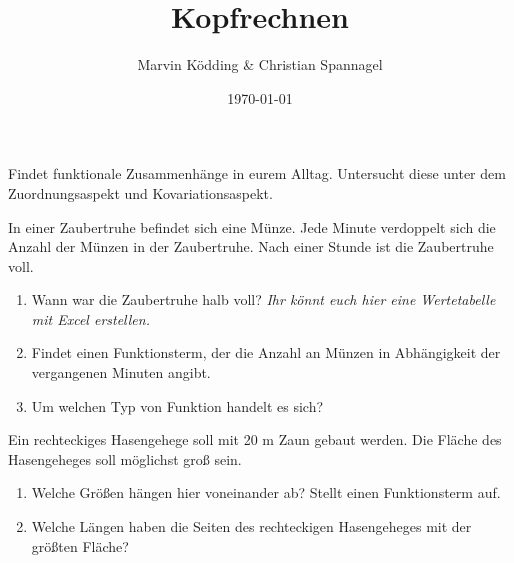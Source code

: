 \documentclass{cssheet}
\title{Kopfrechnen}
\author{Marvin Ködding \& Christian Spannagel}
\date{\today}
\begin{document}
\printtitle

\begin{aufgabe}
	Findet funktionale Zusammenhänge in eurem Alltag. Untersucht diese unter dem Zuordnungsaspekt und Kovariationsaspekt.
\end{aufgabe}

\begin{aufgabe}[Zaubertruhe]
	In einer Zaubertruhe befindet sich eine Münze. Jede Minute verdoppelt sich die Anzahl der Münzen in der Zaubertruhe. Nach einer Stunde ist die Zaubertruhe voll. \begin{enumerate}
		\item Wann war die Zaubertruhe halb voll? \textit{Ihr könnt euch hier eine Wertetabelle mit Excel erstellen.}
		\item Findet einen Funktionsterm, der die Anzahl an Münzen in Abhängigkeit der vergangenen Minuten angibt.
		\item Um welchen Typ von Funktion handelt es sich?
	\end{enumerate}
\end{aufgabe}

\begin{aufgabe}[Hasengehege]
	Ein rechteckiges Hasengehege soll mit 20 m Zaun
	gebaut werden. Die Fläche des Hasengeheges soll möglichst
	groß sein. 
	\begin{enumerate}
		\item Welche Größen hängen hier voneinander ab? Stellt einen Funktionsterm auf.
		\item Welche Längen haben die Seiten des rechteckigen Hasengeheges mit der größten Fläche?
	\end{enumerate}
\end{aufgabe}
\end{document}
